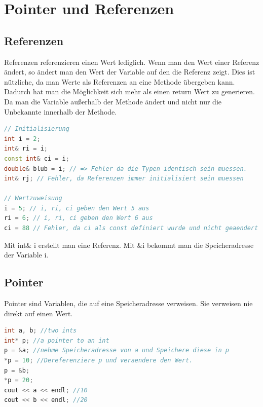 \section{Pointer und Referenzen}
\subsection{Referenzen}
Referenzen referenzieren einen Wert lediglich. Wenn man den Wert einer Referenz ändert, so ändert man den Wert der Variable auf den die Referenz zeigt. Dies ist nützliche, da man Werte als Referenzen an eine Methode übergeben kann. Dadurch hat man die Möglichkeit sich mehr als einen return Wert zu generieren. Da man die Variable außerhalb der Methode ändert und nicht nur die Unbekannte innerhalb der Methode. \\
\begin{lstlisting}[language=C++]
// Initialisierung
int i = 2;
int& ri = i; 
const int& ci = i;
double& blub = i; // => Fehler da die Typen identisch sein muessen.
int& rj; // Fehler, da Referenzen immer initialisiert sein muessen

// Wertzuweisung
i = 5; // i, ri, ci geben den Wert 5 aus
ri = 6; // i, ri, ci geben den Wert 6 aus
ci = 88 // Fehler, da ci als const definiert wurde und nicht geaendert werden kann. 
\end{lstlisting}
Mit int\& i erstellt man eine Referenz. Mit \&i bekommt man die Speicheradresse der Variable i. 
\subsection{Pointer}
Pointer sind Variablen, die auf eine Speicheradresse verweisen. Sie verweisen nie direkt auf einen Wert. 
\begin{lstlisting}[language=C++]
int a, b; //two ints
int* p; //a pointer to an int
p = &a; //nehme Speicheradresse von a und Speichere diese in p
*p = 10; //Dereferenziere p und veraendere den Wert.
p = &b;
*p = 20;
cout << a << endl; //10
cout << b << endl; //20
\end{lstlisting}
